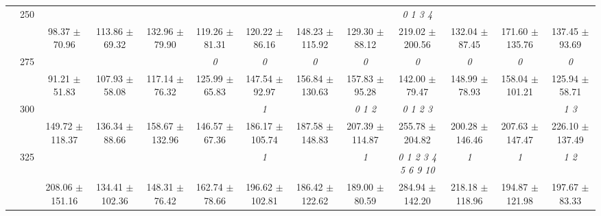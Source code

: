 \begin{table}[h]
{\begin{tabular}{
        ccccccccccccc}
 & \multirow{2}{*}{250}& & & & & & & & \textit{ 0 1 3 4 }& & &  \\ 
 & & 98.37 $\pm$ 70.96& 113.86 $\pm$ 69.32& 132.96 $\pm$ 79.90& 119.26 $\pm$ 81.31& 120.22 $\pm$ 86.16& 148.23 $\pm$ 115.92& 129.30 $\pm$ 88.12& 219.02 $\pm$ 200.56& 132.04 $\pm$ 87.45& 171.60 $\pm$ 135.76& 137.45 $\pm$ 93.69 \\ 
 & \multirow{2}{*}{275}& \cellcolor[HTML]{EFEFEF} & \cellcolor[HTML]{EFEFEF} & \cellcolor[HTML]{EFEFEF} & \cellcolor[HTML]{EFEFEF} \textit{ 0 }& \cellcolor[HTML]{EFEFEF} \textit{ 0 }& \cellcolor[HTML]{EFEFEF} \textit{ 0 }& \cellcolor[HTML]{EFEFEF} \textit{ 0 }& \cellcolor[HTML]{EFEFEF} \textit{ 0 }& \cellcolor[HTML]{EFEFEF} \textit{ 0 }& \cellcolor[HTML]{EFEFEF} \textit{ 0 }& \cellcolor[HTML]{EFEFEF} \textit{ 0 } \\ 
 & & \cellcolor[HTML]{EFEFEF} 91.21 $\pm$ 51.83& \cellcolor[HTML]{EFEFEF} 107.93 $\pm$ 58.08& \cellcolor[HTML]{EFEFEF} 117.14 $\pm$ 76.32& \cellcolor[HTML]{EFEFEF} 125.99 $\pm$ 65.83& \cellcolor[HTML]{EFEFEF} 147.54 $\pm$ 92.97& \cellcolor[HTML]{EFEFEF} 156.84 $\pm$ 130.63& \cellcolor[HTML]{EFEFEF} 157.83 $\pm$ 95.28& \cellcolor[HTML]{EFEFEF} 142.00 $\pm$ 79.47& \cellcolor[HTML]{EFEFEF} 148.99 $\pm$ 78.93& \cellcolor[HTML]{EFEFEF} 158.04 $\pm$ 101.21& \cellcolor[HTML]{EFEFEF} 125.94 $\pm$ 58.71 \\ 
 & \multirow{2}{*}{300}& & & & & \textit{ 1 }& & \textit{ 0 1 2 }& \textit{ 0 1 2 3 }& & & \textit{ 1 3 } \\ 
 & & 149.72 $\pm$ 118.37& 136.34 $\pm$ 88.66& 158.67 $\pm$ 132.96& 146.57 $\pm$ 67.36& 186.17 $\pm$ 105.74& 187.58 $\pm$ 148.83& 207.39 $\pm$ 114.87& 255.78 $\pm$ 204.82& 200.28 $\pm$ 146.46& 207.63 $\pm$ 147.47& 226.10 $\pm$ 137.49 \\ 
 & \multirow{2}{*}{325}& \cellcolor[HTML]{EFEFEF} & \cellcolor[HTML]{EFEFEF} & \cellcolor[HTML]{EFEFEF} & \cellcolor[HTML]{EFEFEF} & \cellcolor[HTML]{EFEFEF} \textit{ 1 }& \cellcolor[HTML]{EFEFEF} & \cellcolor[HTML]{EFEFEF} \textit{ 1 }& \cellcolor[HTML]{EFEFEF} \textit{  0  1  2  3  4  5  6  9 10 }& \cellcolor[HTML]{EFEFEF} \textit{ 1 }& \cellcolor[HTML]{EFEFEF} \textit{ 1 }& \cellcolor[HTML]{EFEFEF} \textit{ 1 2 } \\ 
 & & \cellcolor[HTML]{EFEFEF} 208.06 $\pm$ 151.16& \cellcolor[HTML]{EFEFEF} 134.41 $\pm$ 102.36& \cellcolor[HTML]{EFEFEF} 148.31 $\pm$ 76.42& \cellcolor[HTML]{EFEFEF} 162.74 $\pm$ 78.66& \cellcolor[HTML]{EFEFEF} 196.62 $\pm$ 102.81& \cellcolor[HTML]{EFEFEF} 186.42 $\pm$ 122.62& \cellcolor[HTML]{EFEFEF} 189.00 $\pm$ 80.59& \cellcolor[HTML]{EFEFEF} 284.94 $\pm$ 142.20& \cellcolor[HTML]{EFEFEF} 218.18 $\pm$ 118.96& \cellcolor[HTML]{EFEFEF} 194.87 $\pm$ 121.98& \cellcolor[HTML]{EFEFEF} 197.67 $\pm$ 83.33 \\ 

\end{tabular}}
\end{table}
